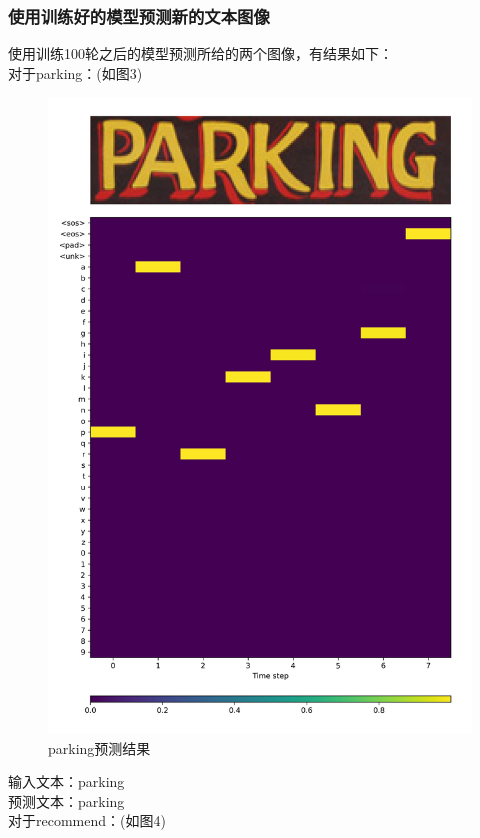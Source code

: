 \documentclass[a4paper]{article}
\begin{document}
\subsubsection{使用训练好的模型预测新的文本图像}
使用训练100轮之后的模型预测所给的两个图像，有结果如下：\\
对于parking：(如图3) \\
\begin{figure}
    \centering
    \includegraphics[width=12cm]{parking_vis.jpg}
    \caption{parking预测结果}
\end{figure}
输入文本：parking \\
预测文本：parking \\
对于recommend：(如图4)
\end{document}
